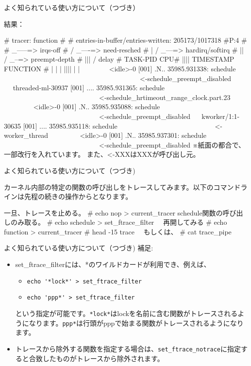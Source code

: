 \begin{frame}[containsverbatim]{よく知られている使い方について（つづき）}

結果：
 \begin{commandlinesmall}
# tracer: function
#
# entries-in-buffer/entries-written: 205173/1017318   #P:4
#
#                              _-----=> irqs-off
#                             / _----=> need-resched
#                            | / _---=> hardirq/softirq
#                            || / _--=> preempt-depth
#                            ||| /     delay
#           TASK-PID   CPU#  ||||    TIMESTAMP  FUNCTION
#              | |       |   ||||       |         |
   　　　　<idle>-0     [001] .N.. 35985.931338: schedule
   　　　　　　　　　　　　　　　　　　　　<-schedule_preempt_disabled
   　    threaded-ml-30937 [001] .... 35985.931365: schedule
   　　　　　　　　　　　　　　<-schedule_hrtimeout_range_clock.part.23
　　　　   <idle>-0     [001] .N.. 35985.935088: schedule
   　　　　　　　　　　　　　　<-schedule_preempt_disabled
　   kworker/1:1-30635 [001] .... 35985.935118: schedule
   　　　　　　　　　　　　　　<-worker_thread
 　　　　  <idle>-0    [001] .N.. 35985.937301: schedule
   　　　　　　　　　　　　　　<-schedule_preempt_disabled
※紙面の都合で、一部改行を入れています。 また、<-XXXはXXXが呼び出し元。
 \end{commandlinesmall}   
\end{frame}

\begin{frame}[containsverbatim]{よく知られている使い方について（つづき)}

 カーネル内部の特定の関数の呼び出しをトレースしてみます。以下のコマンドラインは先程の続きの操作からとなります。
 \begin{commandline}
 一旦、トレースを止める。
 # echo nop > current_tracer
 schedule関数の呼び出しのみ取る。
 # echo schedule > set_ftrace_filter
　再開してみる
 # echo function > current_tracer
 # head -15 trace　
   もしくは、
 # cat trace_pipe
 \end{commandline}   
\end{frame}

\begin{frame}[containsverbatim]{よく知られている使い方について（つづき)}
 補足:
\begin{itemize}
 \item set\_ftrace\_filterには、*のワイルドカードが利用でき、例えば、
   \begin{itemize}
   \item \verb+echo '*lock*' > set_ftrace_filter+
   \item \verb+echo 'ppp*' > set_ftrace_filter+     
   \end{itemize}
   という指定が可能です。\verb+*lock*+はlockを名前に含む関数がトレースされるようになります。\verb+ppp*+は行頭がpppで始まる関数がトレースされるようになります。
 \item トレースから除外する関数を指定する場合は、\verb+set_ftrace_notrace+に指定すると合致したものがトレースから除外されます。
\end{itemize}
\end{frame}

